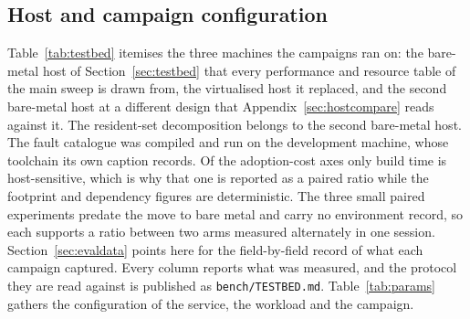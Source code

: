 \documentclass[english,oneside,a4paper,censored,csm,software-track-2020]{HYthesisML}
\begin{document}
\begin{appendices}
\section{Host and campaign configuration\label{appendix:config}}
Table~\ref{tab:testbed} itemises the three machines the campaigns ran on: the bare-metal host of
Section~\ref{sec:testbed} that every performance and resource table of the main sweep is drawn from,
the virtualised host it replaced, and the second bare-metal host at a different design that
Appendix~\ref{sec:hostcompare} reads against it. The resident-set decomposition belongs to the
second bare-metal host. The fault catalogue was compiled and run on the development machine,
whose toolchain its own caption records. Of the adoption-cost axes only build time is
host-sensitive, which is why that one is reported as a paired ratio while the footprint and
dependency figures are deterministic. The three small paired experiments predate the move to
bare metal and carry no environment record, so each supports a ratio between two arms measured
alternately in one session. Section~\ref{sec:evaldata} points here for the field-by-field
record of what each campaign captured. Every column reports what was measured, and the protocol
they are read against is published as \texttt{bench/TESTBED.md}. Table~\ref{tab:params} gathers
the configuration of the service, the workload and the campaign.


\end{appendices}
\end{document}
